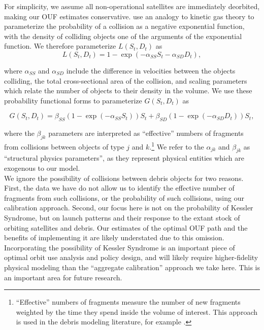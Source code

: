 \documentclass[9pt,twoside,lineno]{pnas-new}
\begin{document}
For simplicity, we assume all non-operational satellites are immediately deorbited, making our OUF estimates conservative. \cite{letiziaetal2017} use an analogy to kinetic gas theory to parameterize the probability of a collision as a negative exponential function, with the density of colliding objects one of the arguments of the exponential function. We therefore parameterize $L(S_t,D_t)$ as
\begin{equation}
\label{collFunction}
L(S_t,D_t) = 1 - \exp(-\alpha_{SS}S_t - \alpha_{SD}D_t),
\end{equation}

where $\alpha_{SS}$ and $\alpha_{SD}$ include the difference in velocities between the objects colliding, the total cross-sectional area of the collision, and scaling parameters which relate the number of objects to their density in the volume. We use these probability functional forms to parameterize $G(S_t,D_t)$ as

\begin{equation}
\label{growthFunction}
G(S_t,D_t) = \beta_{SS} (1 - \exp(-\alpha_{SS}S_t))S_t + \beta_{SD} (1 - \exp(-\alpha_{SD}D_t))S_t,
\end{equation}

where the $\beta_{jk}$ parameters are interpreted as ``effective'' numbers of fragments from collisions between objects of type $j$ and $k$.\footnote{``Effective'' numbers of fragments measure the number of new fragments weighted by the time they spend inside the volume of interest. This approach is used in the debris modeling literature, for example \cite{bradleywein2009}.} We refer to the $\alpha_{jk}$ and $\beta_{jk}$ as ``structural physics parameters'', as they represent physical entities which are exogenous to our model.\\ 

We ignore the possibility of collisions between debris objects for two reasons. First, the data we have do not allow us to identify the effective number of fragments from such collisions, or the probability of such collisions, using our calibration approach. Second, our focus here is not on the probability of Kessler Syndrome, but on launch patterns and their response to the extant stock of orbiting satellites and debris. Our estimates of the optimal OUF path and the benefits of implementing it are likely understated due to this omission. Incorporating the possibility of Kessler Syndrome is an important piece of optimal orbit use analysis and policy design, and will likely require higher-fidelity physical modeling than the ``aggregate calibration'' approach we take here. This is an important area for future research.\\
\end{document}
